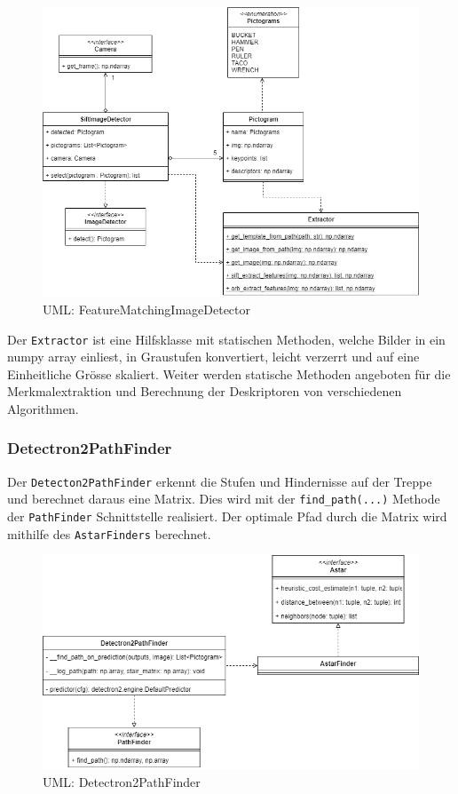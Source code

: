 \begin{figure}[H]
  \includegraphics[width=1\textwidth]{img/softwarearchitektur/UML-FeatureMatchingImageDetector.png}
  \centering
  \caption{UML: FeatureMatchingImageDetector}
  \label{fig:uml-feature-matching-image-detector}
\end{figure}

Der \texttt{Extractor} ist eine Hilfsklasse mit statischen Methoden, welche Bilder in ein numpy array einliest, in Graustufen konvertiert, leicht verzerrt und auf eine Einheitliche Grösse skaliert. Weiter werden statische Methoden angeboten für die Merkmalextraktion und Berechnung der Deskriptoren von verschiedenen Algorithmen.

\subsubsection{Detectron2PathFinder}
Der \texttt{Detecton2PathFinder} erkennt die Stufen und Hindernisse auf der Treppe und berechnet daraus eine Matrix. Dies wird mit der \texttt{find\_path(...)} Methode der \texttt{PathFinder} Schnittstelle realisiert. Der optimale Pfad durch die Matrix wird mithilfe des \texttt{AstarFinders} berechnet.

\begin{figure}[H]
  \includegraphics[width=1\textwidth]{img/softwarearchitektur/UML-PathFinder.png}
  \centering
  \caption{UML: Detectron2PathFinder}
  \label{fig:detectron2-path-finder}
\end{figure}

